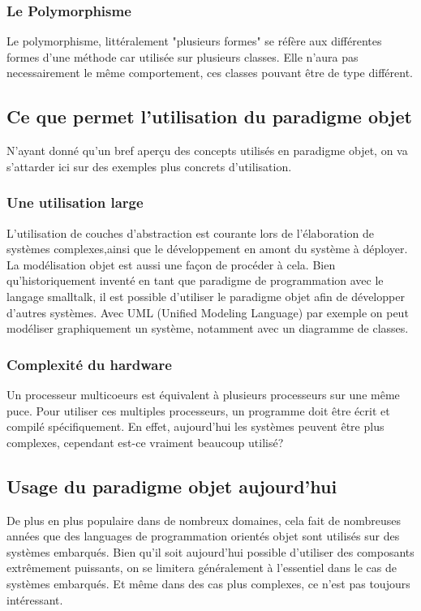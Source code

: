 \documentclass[12pt]{article} %
\begin{document}
\subsubsection{Le Polymorphisme}
Le polymorphisme, littéralement "plusieurs formes" se réfère aux différentes formes d'une méthode car utilisée sur plusieurs classes. Elle n'aura pas necessairement le même comportement, ces classes pouvant être de type différent.

\subsection{Ce que permet l'utilisation du paradigme objet}
N'ayant donné qu'un bref aperçu des concepts utilisés en paradigme objet, on va s'attarder ici sur des exemples plus concrets d'utilisation.
\subsubsection{Une utilisation large}
L'utilisation de couches d'abstraction est courante lors de l'élaboration de systèmes complexes,\cite{SystematicApproach}ainsi que le développement en amont du système à déployer. La modélisation objet est aussi une façon de procéder à cela. 
Bien qu'historiquement inventé en tant que paradigme de programmation avec le langage smalltalk, il est possible d'utiliser le paradigme objet afin de développer d'autres systèmes. Avec UML (Unified Modeling Language) par exemple on peut modéliser graphiquement un système, notamment avec un diagramme de classes.


\subsubsection{Complexité du hardware}
Un processeur multicoeurs est équivalent à plusieurs processeurs sur une même puce. Pour utiliser ces multiples processeurs, un programme doit être écrit et compilé spécifiquement.\cite{Multithread}\cite{MulticoreDSP}
En effet, aujourd'hui les systèmes peuvent être plus complexes, cependant est-ce vraiment beaucoup utilisé?

\subsection{Usage du paradigme objet aujourd'hui}
De plus en plus populaire dans de nombreux domaines, cela fait de nombreuses années que des languages de programmation orientés objet sont utilisés sur des systèmes embarqués.\cite{TimeCritical}
Bien qu'il soit aujourd'hui possible d'utiliser des composants extrêmement puissants, on se limitera généralement à l'essentiel dans le cas de systèmes embarqués.
Et même dans des cas plus complexes, ce n'est pas toujours intéressant.\cite{DesignPattern}
\end{document}
